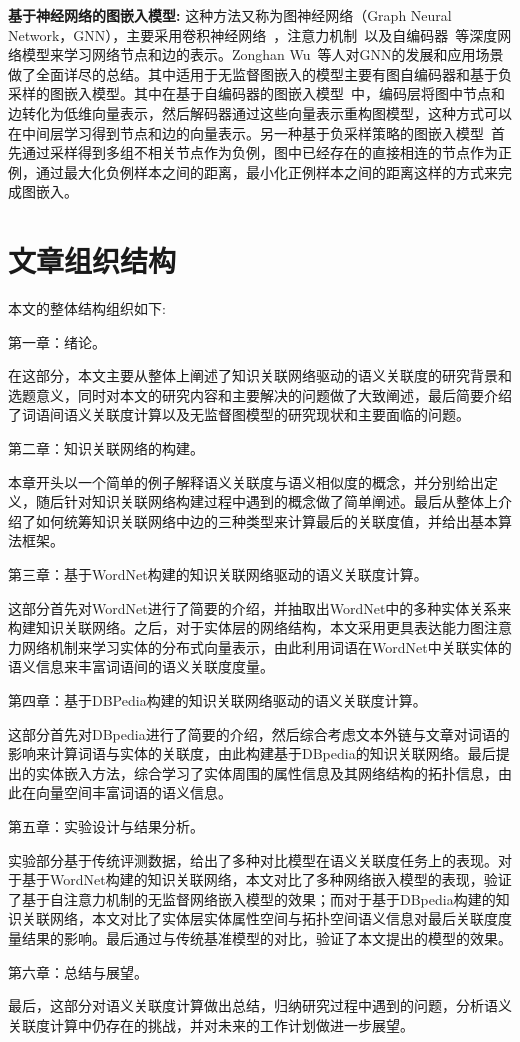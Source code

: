 \textbf{基于神经网络的图嵌入模型:}
这种方法又称为图神经网络（Graph Neural Network，GNN），主要采用卷积神经网络~\cite{MP/Yann}，注意力机制~\cite{corr/VaswaniSPUJGKP17}以及自编码器~\cite{icml/VincentLBM08}等深度网络模型来学习网络节点和边的表示。Zonghan Wu~\cite{corr/Zonghan19}等人对GNN的发展和应用场景做了全面详尽的总结。其中适用于无监督图嵌入的模型主要有图自编码器和基于负采样的图嵌入模型。其中在基于自编码器的图嵌入模型~\cite{corr/KipfW16a, ijcai/PanHLJYZ18}中，编码层将图中节点和边转化为低维向量表示，然后解码器通过这些向量表示重构图模型，这种方式可以在中间层学习得到节点和边的向量表示。另一种基于负采样策略的图嵌入模型~\cite{nips/HamiltonYL17}首先通过采样得到多组不相关节点作为负例，图中已经存在的直接相连的节点作为正例，通过最大化负例样本之间的距离，最小化正例样本之间的距离这样的方式来完成图嵌入。

\section{文章组织结构}
本文的整体结构组织如下:

第一章：绪论。

在这部分，本文主要从整体上阐述了知识关联网络驱动的语义关联度的研究背景和选题意义，同时对本文的研究内容和主要解决的问题做了大致阐述，最后简要介绍了词语间语义关联度计算以及无监督图模型的研究现状和主要面临的问题。

第二章：知识关联网络的构建。

本章开头以一个简单的例子解释语义关联度与语义相似度的概念，并分别给出定义，随后针对知识关联网络构建过程中遇到的概念做了简单阐述。最后从整体上介绍了如何统筹知识关联网络中边的三种类型来计算最后的关联度值，并给出基本算法框架。

第三章：基于WordNet构建的知识关联网络驱动的语义关联度计算。

这部分首先对WordNet进行了简要的介绍，并抽取出WordNet中的多种实体关系来构建知识关联网络。之后，对于实体层的网络结构，本文采用更具表达能力图注意力网络机制来学习实体的分布式向量表示，由此利用词语在WordNet中关联实体的语义信息来丰富词语间的语义关联度度量。


第四章：基于DBPedia构建的知识关联网络驱动的语义关联度计算。

这部分首先对DBpedia进行了简要的介绍，然后综合考虑文本外链与文章对词语的影响来计算词语与实体的关联度，由此构建基于DBpedia的知识关联网络。最后提出的实体嵌入方法，综合学习了实体周围的属性信息及其网络结构的拓扑信息，由此在向量空间丰富词语的语义信息。

第五章：实验设计与结果分析。

实验部分基于传统评测数据，给出了多种对比模型在语义关联度任务上的表现。对于基于WordNet构建的知识关联网络，本文对比了多种网络嵌入模型的表现，验证了基于自注意力机制的无监督网络嵌入模型的效果；而对于基于DBpedia构建的知识关联网络，本文对比了实体层实体属性空间与拓扑空间语义信息对最后关联度度量结果的影响。最后通过与传统基准模型的对比，验证了本文提出的模型的效果。


第六章：总结与展望。

最后，这部分对语义关联度计算做出总结，归纳研究过程中遇到的问题，分析语义关联度计算中仍存在的挑战，并对未来的工作计划做进一步展望。
